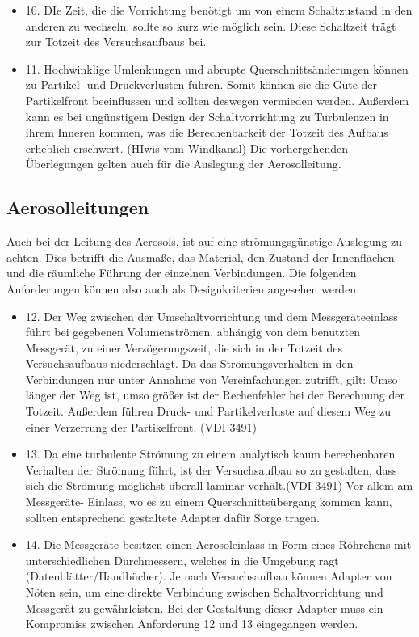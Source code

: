 \begin{itemize}
	\item 10. DIe Zeit, die die Vorrichtung ben\"{o}tigt um von einem Schaltzustand in den anderen zu wechseln, sollte so kurz wie m\"{o}glich sein. Diese Schaltzeit tr\"{a}gt zur Totzeit des Versuchsaufbaus bei. 
	
	\item 11. Hochwinklige Umlenkungen und abrupte Querschnitts\"{a}nderungen k\"{o}nnen zu Partikel- und Druckverlusten f\"{u}hren. Somit k\"{o}nnen sie die G\"{u}te der Partikelfront beeinflussen und sollten deswegen vermieden werden. Außerdem kann es bei ung\"{u}nstigem Design der Schaltvorrichtung zu Turbulenzen in ihrem Inneren kommen, was die Berechenbarkeit der Totzeit des Aufbaus erheblich erschwert. (HIwis vom Windkanal) Die vorhergehenden \"{U}berlegungen gelten auch für die Auslegung der Aerosolleitung.
\end{itemize}

\subsection{Aerosolleitungen}
Auch bei der Leitung des Aerosols, ist auf eine str\"{o}mungsg\"{u}nstige Auslegung zu achten. Dies betrifft die Ausma{\ss}e, das Material, den Zustand der Innenfl\"{a}chen und die r\"{a}umliche F\"{u}hrung der einzelnen Verbindungen. Die folgenden Anforderungen k\"{o}nnen also auch als Designkriterien angesehen werden:

\begin{itemize}
\item 12. Der Weg zwischen der Umschaltvorrichtung und dem Messger\"{a}teeinlass f\"{u}hrt bei gegebenen Volumenstr\"{o}men, abh\"{a}ngig von dem benutzten Messger\"{a}t, zu einer Verz\"{o}gerungszeit, die sich in der Totzeit des Versuchsaufbaus niederschl\"{a}gt. Da das Str\"{o}mungsverhalten in den Verbindungen nur unter Annahme von Vereinfachungen zutrifft, gilt: Umso l\"{a}nger der Weg ist, umso gr\"{o}{\ss}er ist der Rechenfehler bei der Berechnung der Totzeit. Außerdem f\"{u}hren Druck- und Partikelverluste auf diesem Weg zu einer Verzerrung der Partikelfront. (VDI 3491)

\item 13. Da eine turbulente Str\"{o}mung zu einem analytisch kaum berechenbaren Verhalten der Str\"{o}mung f\"{u}hrt, ist der Versuchsaufbau so zu gestalten, dass sich die Str\"{o}mung m\"{o}glichst \"{u}berall laminar verh\"{a}lt.(VDI 3491) Vor allem am Messger\"{a}te- Einlass, wo es zu einem Querschnitts\"{u}bergang kommen kann, sollten entsprechend gestaltete Adapter daf\"{u}r Sorge tragen.

\item 14. Die Messger\"{a}te besitzen einen Aerosoleinlass in Form eines R\"{o}hrchens mit unterschiedlichen Durchmessern, welches in die Umgebung ragt (Datenbl\"{a}tter/Handb\"{u}cher). Je nach Versuchsaufbau k\"{o}nnen Adapter von N\"{o}ten sein, um eine direkte Verbindung zwischen Schaltvorrichtung und Messger\"{a}t zu gew\"{a}hrleisten. Bei der Gestaltung dieser Adapter muss ein Kompromiss zwischen Anforderung 12 und 13 eingegangen werden.
\end{itemize}

